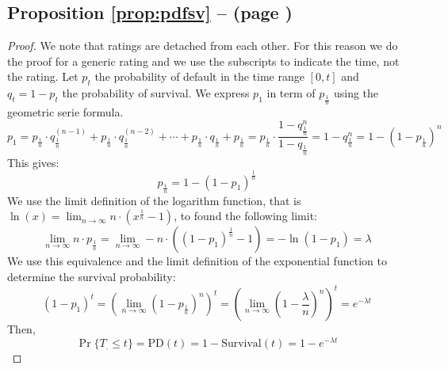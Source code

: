 \documentclass[11pt,fleqn]{book} %
\begin{document}
\subsection{Proposition \ref{prop:pdfsv} --  (page \pageref{prop:pdfsv})}
\begin{proof}
	We note that ratings are detached from each other. 
	For this reason we do the proof for a generic rating and we
	use the subscripts to indicate the time, not the rating.
	Let $p_t$ the probability of default in the time range $[0,t]$ and
	$q_t=1-p_t$ the probability of survival. We express $p_1$ in term
	of $p_{\frac{1}{n}}$ using the geometric serie formula.
	\begin{displaymath}
		p_1 = p_{\frac{1}{n}} \cdot q_{\frac{1}{n}}^{(n-1)} + 
			p_{\frac{1}{n}} \cdot q_{\frac{1}{n}}^{(n-2)} + \cdots + 
			p_{\frac{1}{n}} \cdot q_{\frac{1}{n}} + 
			p_{\frac{1}{n}}
		= p_{\frac{1}{n}} \cdot \frac{1-q_{\frac{1}{n}}^n}{1-q_{\frac{1}{n}}}
		= 1 - q_{\frac{1}{n}}^n
		= 1- (1-p_{\frac{1}{n}})^n
	\end{displaymath}
	This gives:
	\begin{displaymath}
		p_{\frac{1}{n}} = 1-(1-p_1)^{\frac{1}{n}}
	\end{displaymath}
	We use the limit definition of the logarithm function, that is 
	$\ln(x)=\lim_{n \to \infty} n \cdot(x^{\frac{1}{n}}-1)$, to
	found the following limit:
	\begin{displaymath}
		\lim_{n \to \infty} n \cdot p_{\frac{1}{n}} = 
		\lim_{n \to \infty} -n \cdot ((1-p_1)^{\frac{1}{n}} -1) =
		-\ln(1-p_1) = \lambda
	\end{displaymath}
	We use this equivalence and the limit definition of the 
	exponential function to determine the survival probability:
	\begin{displaymath}
		(1-p_1)^t 
		= \left( \lim_{n \to \infty} (1-p_{\frac{1}{n}})^n \right)^t
		= \left(\lim_{n \to \infty} (1-\frac{\lambda}{n})^n \right)^t
		= e^{-\lambda t}
	\end{displaymath}
	Then,
	\begin{displaymath}
		\Pr\{T_. \le t\} = \text{PD}(t) = 
		1 - \text{Survival}(t) = 1 - e^{-\lambda t}
	\end{displaymath}
\end{proof}
\end{document}

